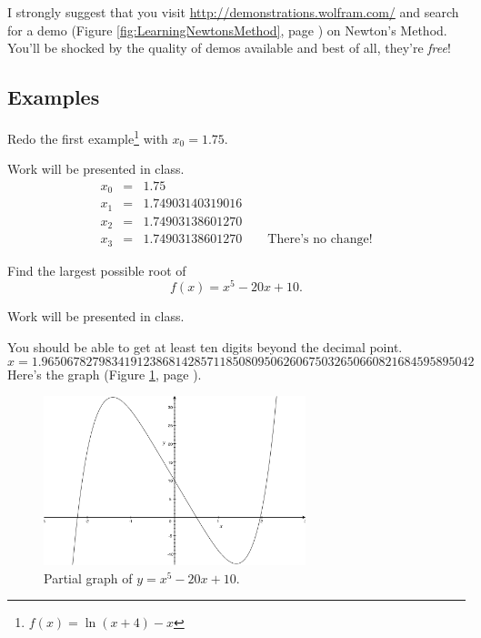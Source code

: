 \documentclass[12pt,addpoints, answers, fleqn]{exam}
\begin{document}
I strongly suggest that you visit \url{http://demonstrations.wolfram.com/} and search for a demo (Figure \ref{fig:LearningNewtonsMethod}, page \pageref{fig:LearningNewtonsMethod}) on Newton's Method. You'll be shocked by the quality of demos available and best of all,  they're \emph{free}!

\subsection{Examples}
\begin{questions}
\question Redo the first example\footnote{$f \left( x \right) = \ln \left( x + 4 \right) - x$} with $x_0= 1.75$.
\begin{solution}
Work will be presented in class.
\begin{eqnarray*}
x_0 &=& 1.75\\
x_1 &=& 1.74903140319016\\
x_2 &=& 1.74903138601270\\
x_3 &=& 1.74903138601270 \qquad \text{There's no change!}
\end{eqnarray*}
\end{solution}
\question Find the largest possible root of
\[
f \left( x \right) = x^5 -20x +10.
\]
\begin{solution}
Work will be presented in class.

You should be able to get at least ten digits beyond the decimal point.
\[
x=1.96506782798341912386814285711850809506260675032650660821684595895042
\]
Here's the graph (Figure \ref{fig:graph2503}, page \pageref{fig:graph2503}).
\end{solution}

\begin{figure}[htbp] %
   \centering
   \includegraphics[width=3in]{./graphics/graph2503.pdf} 
   \caption{Partial graph of $y = x^5 -20x +10$.}
   \label{fig:graph2503}
\end{figure}
\end{questions}
\end{document}
